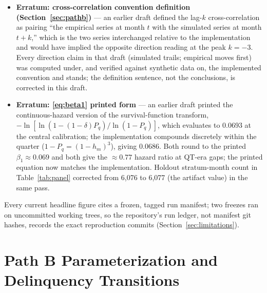 \documentclass[12pt]{article}
\begin{document}
\begin{itemize}
\item \textbf{Erratum: cross-correlation convention definition (Section~\ref{sec:pathb})} --- an earlier draft defined the lag-$k$ cross-correlation as pairing ``the empirical series at month $t$ with the simulated series at month $t+k$,'' which is the two series interchanged relative to the implementation and would have implied the opposite direction reading at the peak $k = -3$. Every direction claim in that draft (simulated trails; empirical moves first) was computed under, and verified against synthetic data on, the implemented convention and stands; the definition sentence, not the conclusions, is corrected in this draft.
\item \textbf{Erratum: \eqref{eq:beta1} printed form} --- an earlier draft printed the continuous-hazard version of the survival-function transform, $-\ln[\ln(1-(1-\delta)P_q)/\ln(1-P_q)]$, which evaluates to $0.0693$ at the central calibration; the implementation compounds discretely within the quarter ($1-P_q = (1-h_m)^3$), giving $0.0686$. Both round to the printed $\beta_1 \approx 0.069$ and both give the $\approx 0.77$ hazard ratio at QT-era gaps; the printed equation now matches the implementation. Holdout stratum-month count in Table~\ref{tab:panel} corrected from 6{,}076 to 6{,}077 (the artifact value) in the same pass.
\end{itemize}
\endgroup

Every current headline figure cites a frozen, tagged run manifest; two freezes ran on uncommitted working trees, so the repository's run ledger, not manifest git hashes, records the exact reproduction commits (Section~\ref{sec:limitations}).


\section{Path B Parameterization and Delinquency Transitions}\label{app:params}
\end{document}
